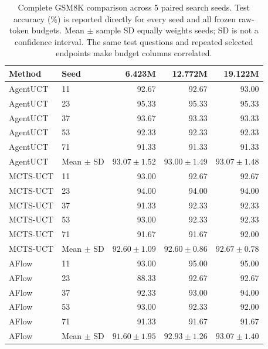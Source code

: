 \begin{table}[t]
\centering\small
\caption{Complete GSM8K comparison across 5 paired search seeds. Test accuracy (\%) is reported directly for every seed and all frozen raw-token budgets. Mean $\pm$ sample SD equally weights seeds; SD is not a confidence interval. The same test questions and repeated selected endpoints make budget columns correlated.}
\label{tab:gsm-counted-all-five-seed}
\begin{tabular}{@{}llrrr@{}}
\toprule
Method & Seed & 6.423M & 12.772M & 19.122M\\
\midrule
AgentUCT & 11 & 92.67 & 92.67 & 93.00\\
AgentUCT & 23 & 95.33 & 95.33 & 95.33\\
AgentUCT & 37 & 93.67 & 93.33 & 93.33\\
AgentUCT & 53 & 92.33 & 92.33 & 92.33\\
AgentUCT & 71 & 91.33 & 91.33 & 91.33\\
AgentUCT & Mean $\pm$ SD & $93.07\pm1.52$ & $93.00\pm1.49$ & $93.07\pm1.48$\\
\midrule
MCTS-UCT & 11 & 93.00 & 92.67 & 92.67\\
MCTS-UCT & 23 & 94.00 & 94.00 & 94.00\\
MCTS-UCT & 37 & 91.33 & 92.33 & 92.33\\
MCTS-UCT & 53 & 93.00 & 92.33 & 92.33\\
MCTS-UCT & 71 & 91.67 & 91.67 & 92.00\\
MCTS-UCT & Mean $\pm$ SD & $92.60\pm1.09$ & $92.60\pm0.86$ & $92.67\pm0.78$\\
\midrule
AFlow & 11 & 93.00 & 95.00 & 95.00\\
AFlow & 23 & 88.33 & 92.67 & 92.67\\
AFlow & 37 & 92.33 & 93.00 & 94.00\\
AFlow & 53 & 93.00 & 92.33 & 92.00\\
AFlow & 71 & 91.33 & 91.67 & 91.67\\
AFlow & Mean $\pm$ SD & $91.60\pm1.95$ & $92.93\pm1.26$ & $93.07\pm1.40$\\
\bottomrule
\end{tabular}
\end{table}
